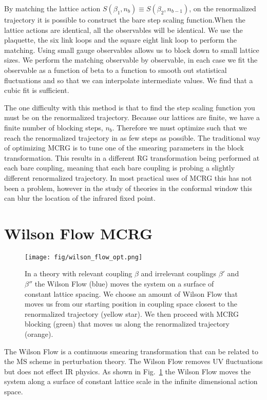 \documentclass{PoS}
\newcommand{\MSbar}{\ensuremath{\overline{\textrm{MS}} } }
\newcommand{\fig}[1]{Fig.~\ref{#1}}
\begin{document}
By matching the lattice action $S(\beta_1, n_b) \equiv S(\beta_2, n_{b - 1})$, on the renormalized trajectory it is possible to construct the bare step scaling function.When the lattice actions are identical, all the observables will be identical.
We use the plaquette, the six link loops and the square eight link loop to perform the matching.
Using small gauge observables allows us to block down to small lattice sizes.
We perform the matching observable by observable, in each case we fit the observable as a function of beta to a function to smooth out statistical fluctuations and so that we can interpolate intermediate values.
We find that a cubic fit is sufficient.

The one difficulty with this method is that to find the step scaling function you must be on the renormalized trajectory.
Because our lattices are finite, we have a finite number of blocking steps, $n_b$.
Therefore we must optimize such that we reach the renormalized trajectory in as few steps as possible.
The traditional way of optimizing MCRG is to tune one of the smearing parameters in the block transformation.
This results in a different RG transformation being performed at each bare coupling, meaning that each bare coupling is probing a slightly different renormalized trajectory.
In most practical uses of MCRG this has not been a problem, however in the study of theories in the conformal window this can blur the location of the infrared fixed point.



\section{Wilson Flow MCRG}
\label{sec:wmcrg}
\begin{figure}[th]
  \centering
  \texttt{[image: fig/wilson\_flow\_opt.png]}
  \caption{In a theory with relevant coupling $\beta$ and irrelevant couplings $\beta'$ and $\beta''$ the Wilson Flow (blue) moves the system on a surface of constant lattice spacing.  We choose an amount of Wilson Flow that moves us from our starting position in coupling space closest to the renormalized trajectory (yellow star).  We then proceed with MCRG blocking (green) that moves us along the renormalized trajectory (orange).}
  \label{fig:wflow_opt}
\end{figure}

The Wilson Flow is a continuous smearing transformation that can be related to the \MSbar scheme in perturbation theory.
The Wilson Flow removes UV fluctuations but does not effect IR physics.
As shown in \fig{fig:wflow_opt} the Wilson Flow moves the system along a surface of constant lattice scale in the infinite dimensional action space.
\end{document}
